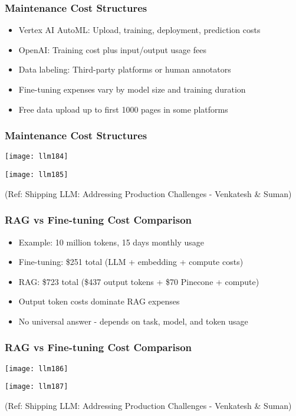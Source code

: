 \begin{frame}[fragile]\frametitle{Maintenance Cost Structures}
      \begin{itemize}
	\item Vertex AI AutoML: Upload, training, deployment, prediction costs
	\item OpenAI: Training cost plus input/output usage fees
	\item Data labeling: Third-party platforms or human annotators
	\item Fine-tuning expenses vary by model size and training duration
	\item Free data upload up to first 1000 pages in some platforms
	  \end{itemize}


\end{frame}

\begin{frame}[fragile]\frametitle{Maintenance Cost Structures}

	\begin{center}
	\texttt{[image: llm184]}
	
	\texttt{[image: llm185]}

	{\tiny (Ref: Shipping LLM: Addressing Production Challenges - Venkatesh \& Suman)}
	\end{center}   
\end{frame}


\begin{frame}[fragile]\frametitle{RAG vs Fine-tuning Cost Comparison}
      \begin{itemize}
	\item Example: 10 million tokens, 15 days monthly usage
	\item Fine-tuning: \$251 total (LLM + embedding + compute costs)
	\item RAG: \$723 total (\$437 output tokens + \$70 Pinecone + compute)
	\item Output token costs dominate RAG expenses
	\item No universal answer - depends on task, model, and token usage
	  \end{itemize}
	  
  
\end{frame}

\begin{frame}[fragile]\frametitle{RAG vs Fine-tuning Cost Comparison}

	\begin{center}
	\texttt{[image: llm186]}
	
	\texttt{[image: llm187]}
	
	{\tiny (Ref: Shipping LLM: Addressing Production Challenges - Venkatesh \& Suman)}
	\end{center} 	  
\end{frame}


